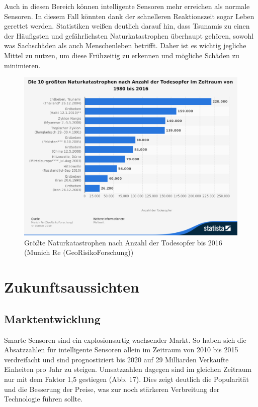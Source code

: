 \documentclass[a4paper,12pt]{scrartcl}
\begin{document}
Auch in diesen Bereich können intelligente Sensoren mehr erreichen als normale Sensoren. In diesem Fall könnten dank der schnelleren Reaktionszeit sogar Leben gerettet werden. Statistiken weißen deutlich darauf hin, dass Tsunamis zu einen der Häufigsten und gefährlichsten Naturkatastrophen überhaupt gehören, sowohl was Sachschäden als auch Menschenleben betrifft. Daher ist es wichtig jegliche Mittel zu nutzen, um diese Frühzeitig zu erkennen und mögliche Schäden zu minimieren.

\begin{figure}[H]
\centering
\includegraphics[scale=0.45]{picture/opfer}
\caption{Größte Naturkatastrophen nach Anzahl der Todesopfer bis 2016 (Munich Re (GeoRisikoForschung))}
\label{fig:Anzahl der Todesopfer durch Tsunami bis 2016}
\end{figure}

\section{Zukunftsaussichten}
\subsection{Marktentwicklung}
Smarte Sensoren sind ein explosionsartig wachsender Markt. So haben sich die Absatzzahlen für intelligente Sensoren allein im Zeitraum von 2010 bis 2015 verdreifacht und sind prognostiziert bis 2020 auf 29 Milliarden Verkaufte Einheiten pro Jahr zu steigen. Umsatzzahlen dagegen sind im gleichen Zeitraum nur mit dem Faktor 1,5 gestiegen (Abb. 17). Dies zeigt deutlich die Popularität und die Besserung der Preise, was zur noch stärkeren Verbreitung der Technologie führen sollte. 
 
\end{document}
